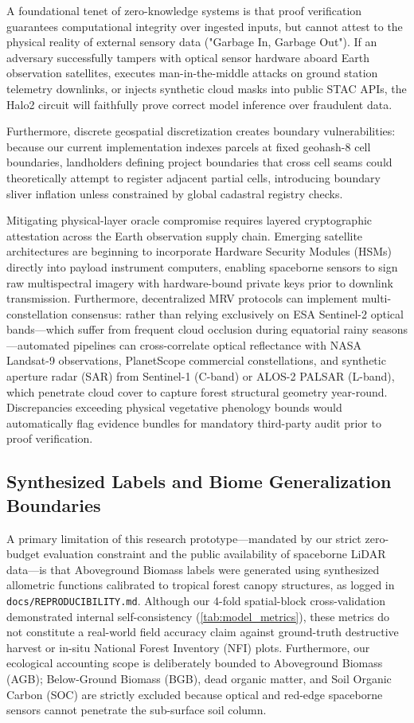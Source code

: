 \documentclass[preprint,12pt]{elsarticle}
\begin{document}
A foundational tenet of zero-knowledge systems is that proof verification guarantees computational integrity over ingested inputs, but cannot attest to the physical reality of external sensory data ("Garbage In, Garbage Out"). If an adversary successfully tampers with optical sensor hardware aboard Earth observation satellites, executes man-in-the-middle attacks on ground station telemetry downlinks, or injects synthetic cloud masks into public STAC APIs, the Halo2 circuit will faithfully prove correct model inference over fraudulent data.

Furthermore, discrete geospatial discretization creates boundary vulnerabilities: because our current implementation indexes parcels at fixed geohash-8 cell boundaries, landholders defining project boundaries that cross cell seams could theoretically attempt to register adjacent partial cells, introducing boundary sliver inflation unless constrained by global cadastral registry checks.

Mitigating physical-layer oracle compromise requires layered cryptographic attestation across the Earth observation supply chain. Emerging satellite architectures are beginning to incorporate Hardware Security Modules (HSMs) directly into payload instrument computers, enabling spaceborne sensors to sign raw multispectral imagery with hardware-bound private keys prior to downlink transmission. Furthermore, decentralized MRV protocols can implement multi-constellation consensus: rather than relying exclusively on ESA Sentinel-2 optical bands—which suffer from frequent cloud occlusion during equatorial rainy seasons—automated pipelines can cross-correlate optical reflectance with NASA Landsat-9 observations, PlanetScope commercial constellations, and synthetic aperture radar (SAR) from Sentinel-1 (C-band) or ALOS-2 PALSAR (L-band), which penetrate cloud cover to capture forest structural geometry year-round. Discrepancies exceeding physical vegetative phenology bounds would automatically flag evidence bundles for mandatory third-party audit prior to proof verification.

\subsection{Synthesized Labels and Biome Generalization Boundaries}

A primary limitation of this research prototype—mandated by our strict zero-budget evaluation constraint and the public availability of spaceborne LiDAR data—is that Aboveground Biomass labels were generated using synthesized allometric functions calibrated to tropical forest canopy structures, as logged in \texttt{docs/REPRODUCIBILITY.md}. Although our 4-fold spatial-block cross-validation demonstrated internal self-consistency (\autoref{tab:model_metrics}), these metrics do not constitute a real-world field accuracy claim against ground-truth destructive harvest or in-situ National Forest Inventory (NFI) plots. Furthermore, our ecological accounting scope is deliberately bounded to Aboveground Biomass (AGB); Below-Ground Biomass (BGB), dead organic matter, and Soil Organic Carbon (SOC) are strictly excluded because optical and red-edge spaceborne sensors cannot penetrate the sub-surface soil column.
\end{document}
